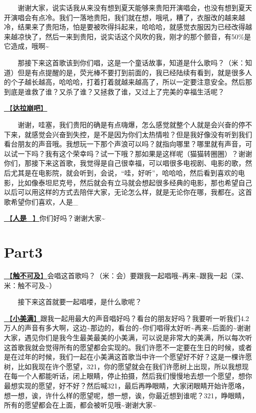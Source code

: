 \documentclass[]{ctexbook}
\begin{document}
  谢谢大家，说实话我从来没有想到夏天能够来贵阳开演唱会，也没有想到夏天开演唱会有点冷。我们一落地贵阳，我们就在想，哦吼，糟了，衣服改的越来越冷，结果来了贵阳场，怕是要被吹得抖起来，哈哈哈，就感觉衣服因为已经改得越来越凉快了，然后一来到贵阳，说实话这个风吹的我，刚才的那个颤音，有50\%是它造成，哦啊\textasciitilde{}

  那接下来这首歌该到你们唱，这是一个童话故事，知道是什么歌吗？（米：知道）但是有点提醒的是，荧光棒不要打到前面的，我已经陆续有看到，就是很多人的个子越长越高，哈哈哈，打着打着就越来越高了，所以一定要注意安全。然后那到底是谁救了谁？又杀了谁？又拯救了谁，又过上了完美的幸福生活呢？

\hyperref[dalabengba]{🎵【\textbf{达拉崩吧}】}

  谢谢，哇塞，我们贵阳的确是有点嗨爆，怎么感觉就整个人就是会兴奋的停不下来，就感觉会兴奋到失控，是不是因为你们太热情啦？但是我好像没有听到我们看台朋友的声音哦。我想玩一下那个声浪可以吗？就指向哪里？哪里就有声音，可以试一下吗？我有这个荣幸吗？试一下哦？那如果是这样呢（猫猫转圈圈）？谢谢你们，那接下来这首歌，我觉得是自己很幸福，可以唱很多电视剧、电影的歌，然后尤其是在电影院，就会听到，会说，``哇，好听''，哈哈哈，然后看到喜欢的电影，比如像泰坦尼克号，然后就会有立马就会想起很多经典的电影，那也希望自己以后可以用这样的方式去陪伴大家，无论怎么样，就是无论你在哪，我都在。这首歌希望你们喜欢，人是\_

\hyperref[renshi]{🎵【\textbf{人是\_}】}你们好吗？谢谢大家\textasciitilde{}

\section{Part3}\label{guiyang-20240713-part3}

\hyperref[untouchable]{🎵【\textbf{触不可及}】}会唱这首歌吗？（米：会）要跟我一起唱哦\textasciitilde 再来\textasciitilde 跟我一起（深、米：触不可及\textasciitilde）

  接下来这首就要一起唱喽，是什么歌呢？

\hyperref[happy-ending]{🎵【\textbf{小美满}】}跟我一起用最大的声音唱好吗？看台的朋友好吗？我要听一听我们4.2万人的声音有多大啊，这边\textasciitilde 那边的，看台的\textasciitilde 你们唱得太好听\textasciitilde 再来\textasciitilde 后面的\textasciitilde 谢谢大家，遇见你们是我今生最美最美的小美满，可以说是非常大的美满，所以每次听这首歌我就会觉得所有的愿望都会实现的。我们许愿不一定要在生日的时候，或者是在过年的时候，我们一起在小美满这首歌当中许一个愿望好不好？这是一棵许愿树，比如我现在许个愿望，321，你的愿望就会在我们许愿树上出现，所以我想现在每一个人都能听话，闭上眼睛，停止拍摄，然后我们慢慢地去想一个愿望，想你最想实现的愿望，好不好？然后喊321，最后再睁眼睛，大家闭眼睛开始许愿咯，想一想，诶，许什么样的愿望呢，想一想，诶，你最近想到谁呢？321，睁眼睛，所有的愿望都会在上面，都会被听见哦\textasciitilde 谢谢大家\textasciitilde{}
\end{document}
